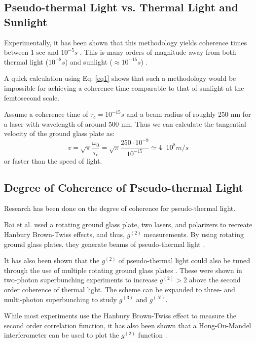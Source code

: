 \documentclass{article}
\begin{document}
\subsection{Pseudo-thermal Light vs. Thermal Light and Sunlight}

Experimentally, it has been shown that this methodology yields coherence times between 1 sec
and $10^{-5}s$ \cite{Spiller2014}. This is many orders of magnitude away from both thermal light
($10^{-8}s$) and sunlight ($\approx 10^{-15}s$) \cite{Kano1962}.

A quick calculation using Eq. \ref{eq1} shows that such a methodology would be impossible
for achieving a coherence time comparable to that of sunlight at the femtosecond scale.

Assume a coherence time of $\tau_c = 10^{-15}s$ and a beam radius of roughly 250
nm for a laser with wavelength of around 500 nm. Thus we can calculate the tangential velocity
of the ground glass plate as:
\begin{equation}
  v = \sqrt{\pi}\frac{\omega_0}{\tau_c} = \sqrt{\pi}\frac{250 \cdot 10^{-9}}{10^{-15}} \simeq 4\cdot10^{8} m/s
\end{equation}
or faster than the speed of light.

\subsection{Degree of Coherence of Pseudo-thermal Light}

Research has been done on the degree of coherence for pseudo-thermal light.

Bai et al. used a rotating ground glass plate, two lasers, and polarizers
to recreate Hanbury Brown-Twiss effects, and thus, $g^{(2)}$ measurements. By using rotating ground glass plates,
they generate beams of pseudo-thermal light \cite{Bai2017}.

It has also been shown that the $g^{(2)}$ of pseudo-thermal light could also be tuned through the use of multiple rotating ground glass plates \cite{Bai,Zhou2017}. These were shown in two-photon superbunching experiments to increase $g^{(2)} > 2$ above the second order coherence of thermal light. The scheme can be expanded to three- and multi-photon superbunching to study $g^{(3)}$ and $g^{(N)}$.

While most experiments use the Hanbury Brown-Twiss effect to measure the second order correlation function, it has also been shown that a Hong-Ou-Mandel interferometer can be used to plot the $g^{(2)}$ function \cite{Liu2013}.
\end{document}
